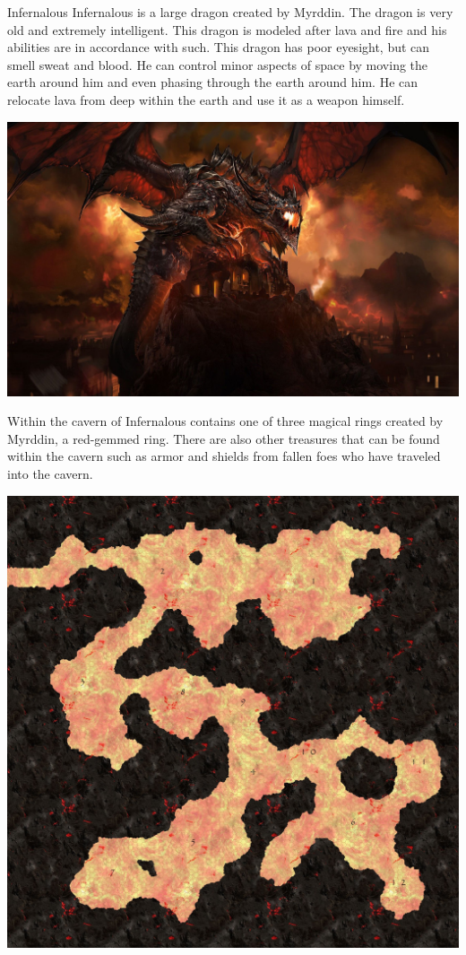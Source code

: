 \begin{commentbox}{Infernalous}
	Infernalous is a large dragon created by Myrddin. The dragon is very old and extremely intelligent. This dragon is modeled after lava and fire and his abilities are in accordance with such. This dragon has poor eyesight, but can smell sweat and blood. He can control minor aspects of space by moving the earth around him and even phasing through the earth around him. He can relocate lava from deep within the earth and use it as a weapon himself.
	
	\begin{center}
	\includegraphics[width=0.7\linewidth]{img/WoW/deathwing.jpg}
	\end{center}

	Within the cavern of Infernalous contains one of three magical rings created by Myrddin, a red-gemmed ring. There are also other treasures that can be found within the cavern such as armor and shields from fallen foes who have traveled into the cavern. 

	\begin{center}
	\includegraphics[width=0.7\linewidth]{img/maps/infernalous.jpg}
	\end{center}
\end{commentbox}

